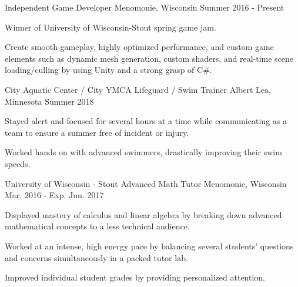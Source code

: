 

\begin{cventries}

  \cventry
    {Independent} %
    {Game Developer} %
    {Menomonie, Wisconsin} %
    {Summer 2016 - Present} %
    {
      \begin{cvitems} %
        \item {Winner of University of Wisconsin-Stout spring game jam.}
        \item {Create smooth gameplay, highly optimized performance, and custom game elements such as dynamic mesh generation, custom shaders, and real-time scene loading/culling by using Unity and a strong grasp of C\#.}
      \end{cvitems}
    }

  \cventry
    {City Aquatic Center / City YMCA} %
    {Lifeguard / Swim Trainer} %
    {Albert Lea, Minnesota} %
    {Summer 2018} %
    {
      \begin{cvitems} %
        \item {Stayed alert and focused for several hours at a time while communicating as a team to ensure a summer free of incident or injury.}
        \item {Worked hands on with advanced swimmers, drastically improving their swim speeds.}
      \end{cvitems}
    }

  \cventry
    {University of Wisconsin - Stout} %
    {Advanced Math Tutor} %
    {Menomonie, Wisconsin} %
    {Mar. 2016 - Exp. Jun. 2017} %
    {
      \begin{cvitems} %
        \item {Displayed mastery of calculus and linear algebra by breaking down advanced mathematical concepts to a less technical audience.}
        \item {Worked at an intense, high energy pace by balancing several students’ questions and concerns simultaneously in a packed tutor lab.}
        \item {Improved individual student grades by providing personalized attention.}
      \end{cvitems}
    }


\end{cventries}
